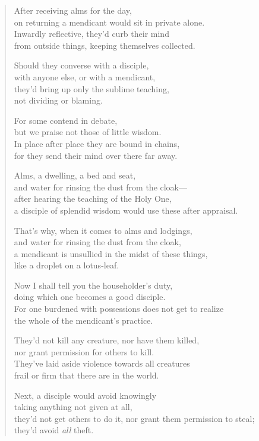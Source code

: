 \documentclass[12pt,openany]{book}%
\begin{document}
\begin{verse}
After receiving alms for the day, \\
on returning a mendicant would sit in private alone. \\
Inwardly reflective, they’d curb their mind \\
from outside things, keeping themselves collected. 

Should they converse with a disciple, \\
with anyone else, or with a mendicant, \\
they’d bring up only the sublime teaching, \\
not dividing or blaming. 

For some contend in debate, \\
but we praise not those of little wisdom. \\
In place after place they are bound in chains, \\
for they send their mind over there far away. 

Alms, a dwelling, a bed and seat, \\
and water for rinsing the dust from the cloak—\\
after hearing the teaching of the Holy One, \\
a disciple of splendid wisdom would use these after appraisal. 

That’s why, when it comes to alms and lodgings, \\
and water for rinsing the dust from the cloak, \\
a mendicant is unsullied in the midst of these things, \\
like a droplet on a lotus-leaf. 

Now I shall tell you the householder’s duty, \\
doing which one becomes a good disciple. \\
For one burdened with possessions does not get to realize \\
the whole of the mendicant’s practice. 

They’d not kill any creature, nor have them killed, \\
nor grant permission for others to kill. \\
They’ve laid aside violence towards all creatures \\
frail or firm that there are in the world. 

Next, a disciple would avoid knowingly \\
taking anything not given at all, \\
they’d not get others to do it, nor grant them permission to steal; \\
they’d avoid \emph{all} theft. 


\end{verse}
\end{document}
